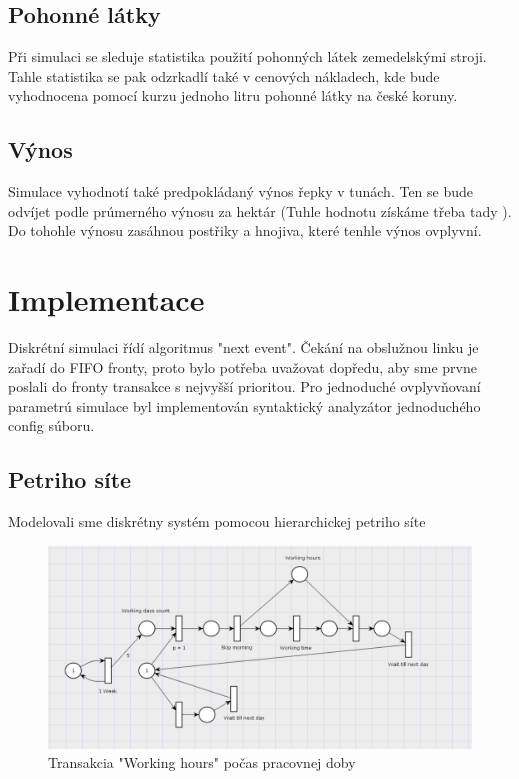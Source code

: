 \documentclass[11pt,a4paper,titlepage]{article}
\begin{document}
\subsection{Pohonné látky}
Při simulaci se sleduje statistika použití pohonných látek zemedelskými stroji. Tahle statistika se pak odzrkadlí také v cenových nákladech, kde bude vyhodnocena pomocí kurzu jednoho litru pohonné látky na české koruny.

\subsection{Výnos}
Simulace vyhodnotí také predpokládaný výnos řepky v tunách. Ten se bude odvíjet podle prúmerného výnosu za hektár (Tuhle hodnotu získáme třeba tady ). Do tohohle výnosu zasáhnou postřiky a hnojiva, které tenhle výnos ovplyvní.

\pagebreak
\section{Implementace}
Diskrétní simulaci řídí algoritmus "next event". Čekání na obslužnou linku je zařadí do FIFO fronty, proto bylo potřeba uvažovat dopředu, aby sme prvne poslali do fronty transakce s nejvyšší prioritou.
Pro jednoduché ovplyvňovaní parametrú simulace byl implementován syntaktický analyzátor jednoduchého config súboru.

\subsection{Petriho síte}
Modelovali sme diskrétny systém pomocou hierarchickej petriho síte

\begin{figure}[ht!]
\centering
\includegraphics[scale=0.3]{img/WeekGen.png}
\caption{Transakcia "Working hours" počas pracovnej doby}
\end{figure}
\end{document}
